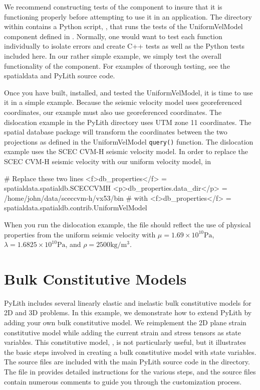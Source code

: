 We recommend constructing tests of the component to insure that it is
functioning properly before attempting to use it in an application.
The  directory within 
contains a Python script, , that runs the
tests of the UniformVelModel component defined in
.  Normally, one would want to test
each function individually to isolate errors and create C++ tests as
well as the Python tests included here.  In our rather simple example,
we simply test the overall functionality of the component. For
examples of thorough testing, see the spatialdata and PyLith source
code.

Once you have built, installed, and tested the UniformVelModel, it
is time to use it in a simple example. Because the seismic velocity
model uses georeferenced coordinates, our example must also use georeferenced
coordinates. The dislocation example in the PyLith 
directory uses UTM zone 11 coordinates. The spatial database package
will transform the coordinates between the two projections as defined
in the UniformVelModel \texttt{query()} function. The dislocation
example uses the SCEC CVM-H seismic velocity model. In order to replace
the SCEC CVM-H seismic velocity with our uniform velocity model, in
\begin{cfg}
# Replace these two lines
<f>db_properties</f> = spatialdata.spatialdb.SCECCVMH
<p>db_properties.data_dir</p> = /home/john/data/sceccvm-h/vx53/bin
# with
<f>db_properties</f> = spatialdata.spatialdb.contrib.UniformVelModel
\end{cfg}
When you run the dislocation example, the 
file should reflect the use of physical properties from the uniform
seismic velocity with $\mu=1.69\times10^{10}\mathrm{Pa}$, $\lambda=1.6825\times10^{10}\mathrm{Pa}$,
and $\rho=2500\mathrm{kg/m^{3}}$.


\section{Bulk Constitutive Models}
\label{sec:extending:materials}

PyLith includes several linearly elastic and inelastic bulk
constitutive models for 2D and 3D problems. In this example, we
demonstrate how to extend PyLith by adding your own bulk constitutive
model. We reimplement the 2D plane strain constitutive model while
adding the current strain and stress tensors as state variables. This
constitutive model, , is not particularly
useful, but it illustrates the basic steps involved in creating a bulk
constitutive model with state variables. The source files are included
with the main PyLith source code in the 
directory. The  file in
 provides detailed instructions for the
various steps, and the source files contain numerous comments to guide
you through the customization process.

